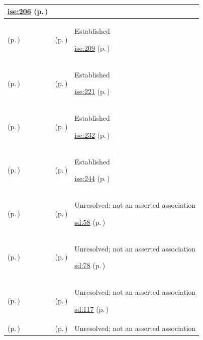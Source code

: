 \begin{longtable}{|>{\raggedright\arraybackslash}p{0.27\TableWidth}|>{\raggedright\arraybackslash}p{0.27\TableWidth}|>{\raggedright\arraybackslash}p{0.46\TableWidth}|}
 \hyperref[rad:ise:200]{ise:206} (p.\,\pageref{rad:ise:200})\\\hline
\nameref{service:temporal-context-resolution} (p.\,\pageref{service:temporal-context-resolution}) & \nameref{feature:feat-ise-25} (p.\,\pageref{feature:feat-ise-25}) & Established

 \hyperref[rad:ise:200]{ise:209} (p.\,\pageref{rad:ise:200})\\\hline
\nameref{service:contextual-presentation-service} (p.\,\pageref{service:contextual-presentation-service}) & \nameref{feature:feat-ise-26} (p.\,\pageref{feature:feat-ise-26}) & Established

 \hyperref[rad:ise:215]{ise:221} (p.\,\pageref{rad:ise:215})\\\hline
\nameref{service:semantic-model-definition-service} (p.\,\pageref{service:semantic-model-definition-service}) & \nameref{feature:feat-ise-27} (p.\,\pageref{feature:feat-ise-27}) & Established

 \hyperref[rad:ise:227]{ise:232} (p.\,\pageref{rad:ise:227})\\\hline
\nameref{service:semantic-conformance-verification-service} (p.\,\pageref{service:semantic-conformance-verification-service}) & \nameref{feature:feat-ise-28} (p.\,\pageref{feature:feat-ise-28}) & Established

 \hyperref[rad:ise:227]{ise:244} (p.\,\pageref{rad:ise:227})\\\hline
\nameref{service:chronic-care-timeline-query} (p.\,\pageref{service:chronic-care-timeline-query}) & \nameref{feature:feat-sd-02} (p.\,\pageref{feature:feat-sd-02}) & Unresolved; not an asserted association

 \hyperref[rad:sd:51]{sd:58} (p.\,\pageref{rad:sd:51})\\\hline
\nameref{service:acute-clinical-alert-dispatch} (p.\,\pageref{service:acute-clinical-alert-dispatch}) & \nameref{feature:feat-sd-03} (p.\,\pageref{feature:feat-sd-03}) & Unresolved; not an asserted association

 \hyperref[rad:sd:71]{sd:78} (p.\,\pageref{rad:sd:71})\\\hline
\nameref{service:discharge-dossier-packaging-service} (p.\,\pageref{service:discharge-dossier-packaging-service}) & \nameref{feature:feat-sd-08} (p.\,\pageref{feature:feat-sd-08}) & Unresolved; not an asserted association

 \hyperref[rad:sd:110]{sd:117} (p.\,\pageref{rad:sd:110})\\\hline
\nameref{service:modality-worklist-distribution} (p.\,\pageref{service:modality-worklist-distribution}) & \nameref{feature:feat-sd-09} (p.\,\pageref{feature:feat-sd-09}) & Unresolved; not an asserted association


\end{longtable}
